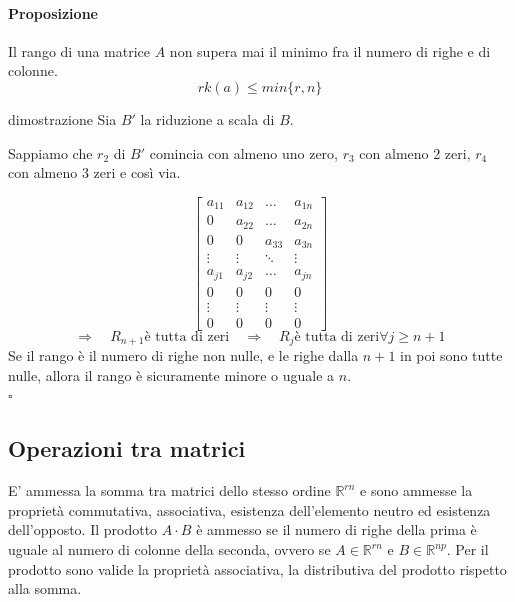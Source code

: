 \documentclass[x11names]{article}
\newcommand*{\QEDB}{\null\nobreak\hfill\ensuremath{\square}}%
\begin{document}
\paragraph{Proposizione}
Il rango di una matrice $A$ non supera mai il minimo fra il numero di righe e di colonne.
\[
rk\left(a\right) \leq min\{r,n\} 
\]

\begin{es}{dimostrazione}
Sia $B'$ la riduzione a scala di $B$.
 
Sappiamo che $r_2$ di $B'$ comincia con almeno uno zero, $r_3$ con almeno 2 zeri, $r_4$ con almeno 3 zeri e così via. 

\[
\begin{bmatrix}
	a_{11} & a_{12} & \dots & a_{1n}  \\
	0     & a_{22}& \dots & a_{2n}  \\
	0 & 0 & a_{33} &  a_{3n}  \\
	\vdots & \vdots & \ddots & \vdots \\
	a_{j1} & a_{j2} & \dots & a_{jn}  \\
	0 & 0 & 0 & 0 \\
	\vdots &\vdots &\vdots &\vdots \\
	0 & 0 & 0 & 0 
\end{bmatrix}
\] 
\[
\Rightarrow \quad R_{n+1} \text{è tutta di zeri}
\quad \Rightarrow \quad R_{j} \text{è tutta di zeri} \forall j \geq n + 1
\]
Se il rango è il numero di righe non nulle, e le righe dalla $n+1$ in poi sono tutte nulle, allora il rango è sicuramente minore o uguale a $n$. 
\\
\QEDB
\end{es}


\subsection{Operazioni tra matrici}
E' ammessa la somma tra matrici dello stesso ordine $\mathbb{R}^{rn}$ e sono ammesse la proprietà commutativa, associativa, esistenza dell’elemento neutro ed esistenza dell’opposto. Il prodotto $A\cdot B$ è ammesso se il numero di righe della prima è uguale al numero di colonne della seconda, ovvero se $A \in \mathbb{R}^{rn}$ e $B\in \mathbb{R}^{np}$. Per il prodotto sono valide la proprietà associativa, la distributiva del prodotto rispetto alla somma.
\end{document}
